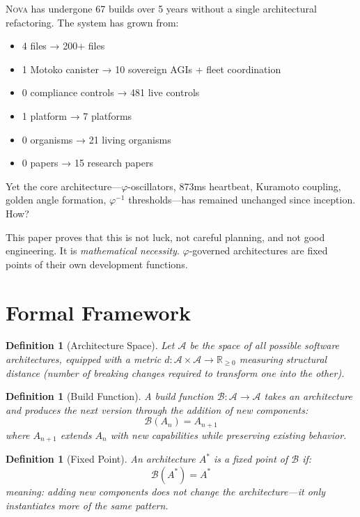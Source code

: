 \documentclass[12pt]{article}
\newtheorem{definition}[theorem]{Definition}
\newcommand{\PHI}{\varphi}
\newcommand{\PHIINV}{\varphi^{-1}}
\newcommand{\NOVA}{\textsc{Nova}}
\newcommand{\R}{\mathbb{R}}
\newcommand{\Arch}{\mathcal{A}}
\newcommand{\Build}{\mathcal{B}}
\begin{document}
\NOVA{} has undergone 67 builds over 5 years without a single architectural refactoring. The system has grown from:
\begin{itemize}
    \item 4 files → 200+ files
    \item 1 Motoko canister → 10 sovereign AGIs + fleet coordination
    \item 0 compliance controls → 481 live controls
    \item 1 platform → 7 platforms
    \item 0 organisms → 21 living organisms
    \item 0 papers → 15 research papers
\end{itemize}

Yet the core architecture—$\PHI$-oscillators, 873ms heartbeat, Kuramoto coupling, golden angle formation, $\PHIINV$ thresholds—has remained unchanged since inception. How?

This paper proves that this is not luck, not careful planning, and not good engineering. It is \emph{mathematical necessity}. $\PHI$-governed architectures are fixed points of their own development functions.

\section{Formal Framework}

\begin{definition}[Architecture Space]
Let $\Arch$ be the space of all possible software architectures, equipped with a metric $d: \Arch \times \Arch \to \R_{\geq 0}$ measuring structural distance (number of breaking changes required to transform one into the other).
\end{definition}

\begin{definition}[Build Function]
A build function $\Build: \Arch \to \Arch$ takes an architecture and produces the next version through the addition of new components:
\[
\Build(A_n) = A_{n+1}
\]
where $A_{n+1}$ extends $A_n$ with new capabilities while preserving existing behavior.
\end{definition}

\begin{definition}[Fixed Point]
An architecture $A^*$ is a fixed point of $\Build$ if:
\[
\Build(A^*) = A^*
\]
meaning: adding new components does not change the architecture—it only instantiates more of the same pattern.
\end{definition}
\end{document}

